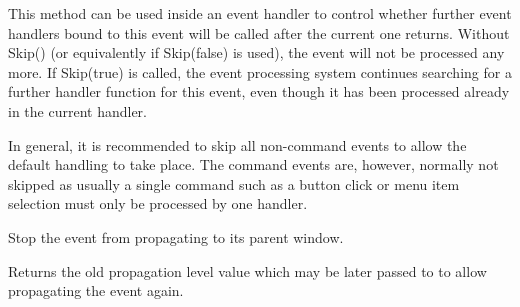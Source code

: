 \label{wxeventskip}


This method can be used inside an event handler to control whether further
event handlers bound to this event will be called after the current one
returns. Without Skip() (or equivalently if Skip(false) is used),
the event will not be processed any more. If Skip(true) is called, the event
processing system continues searching for a further handler function for this
event, even though it has been processed already in the current handler.

In general, it is recommended to skip all non-command events to allow the
default handling to take place. The command events are, however, normally not
skipped as usually a single command such as a button click or menu item
selection must only be processed by one handler.


\label{wxeventstoppropagation}


Stop the event from propagating to its parent window.

Returns the old propagation level value which may be later passed to 
 to allow propagating the
event again.

